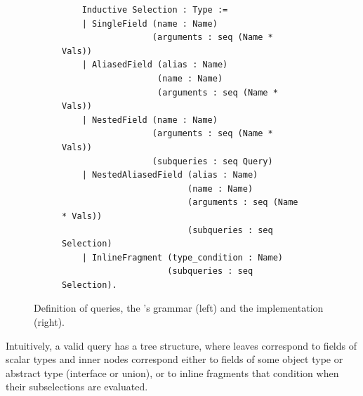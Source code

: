 \begin{figure}[h]
\begin{subfigure}{.5\textwidth}
\begin{verbatim}
    Inductive Selection : Type :=
    | SingleField (name : Name)
                  (arguments : seq (Name * Vals))
    | AliasedField (alias : Name)
                   (name : Name)
                   (arguments : seq (Name * Vals))
    | NestedField (name : Name)
                  (arguments : seq (Name * Vals))
                  (subqueries : seq Query)
    | NestedAliasedField (alias : Name)
                         (name : Name)
                         (arguments : seq (Name * Vals))
                         (subqueries : seq Selection)
    | InlineFragment (type_condition : Name)
                     (subqueries : seq Selection).
    \end{verbatim}
  \end{subfigure}
  \caption{Definition of \gql queries, the \spec's grammar (left) and the \coq implementation (right).}
  \label{fig:query_def}
\end{figure}

Intuitively, a valid query has a tree structure, where leaves correspond to fields of scalar types and inner nodes correspond either to fields of some object type or abstract type (interface or union), or to inline fragments that condition when their subselections are evaluated. 

